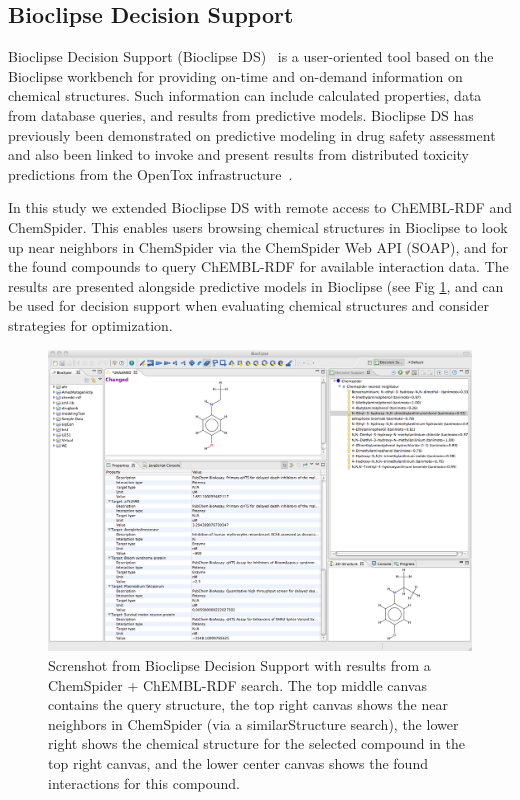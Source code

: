 \documentclass[10pt]{bmc_article}
\newenvironment{bmcformat}{\begin{raggedright}\baselineskip20pt\sloppy\setboolean{publ}{false}}{\end{raggedright}\baselineskip20pt\sloppy}
\begin{document}
\begin{bmcformat}
\subsection*{Bioclipse Decision Support}


Bioclipse Decision Support (Bioclipse DS)~\cite{Spjuth:2011uq} is a user-oriented tool based on the Bioclipse 
workbench for providing on-time and on-demand information on chemical structures. 
Such information can include calculated properties, data from database queries, 
and results from predictive models. Bioclipse DS has previously been demonstrated on predictive 
modeling in drug safety assessment~\cite{Spjuth:2011uq} and also been linked to invoke and 
present results from distributed toxicity predictions from the OpenTox infrastructure~\cite{Willighagen:2011kx}.

In this study we extended Bioclipse DS with remote access to ChEMBL-RDF and ChemSpider. 
This enables users browsing chemical structures in Bioclipse to look up near neighbors in ChemSpider 
via the ChemSpider Web API (SOAP), and for the found compounds to query ChEMBL-RDF for 
available interaction data. The results are presented alongside predictive models in Bioclipse (see Fig \ref{fig:bioclipse-ds}, and can be used for decision support when evaluating chemical structures and consider 
strategies for optimization.

\begin{figure}[!ht]
		\begin{center}
		\includegraphics[width=16cm]{bioclipse-ds.png}
		\newline
		\caption[wee]{Screnshot from Bioclipse Decision Support with results from a ChemSpider + ChEMBL-RDF search. The top middle canvas contains the query structure, the top right canvas shows the near neighbors in ChemSpider (via a similarStructure search), the lower right shows the chemical structure for the selected compound in the top right canvas, and the lower center canvas shows the found interactions for this compound.}
	\label{fig:bioclipse-ds}
		\end{center}
\end{figure}



\end{bmcformat}
\end{document}

